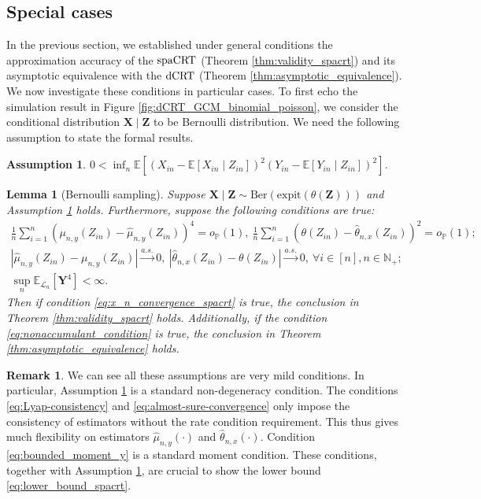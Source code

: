 \documentclass[12pt]{article}
\newtheorem{assumption}{Assumption}
\newtheorem{lemma}{Lemma}
\theoremstyle{definition}
\newtheorem{remark}{Remark}
\def\P{\mathbb{P}}
\def\P{\mathbb{P}}
\newcommand{\E}{\mathbb E}								%
\renewcommand{\P}{\mathbb{P}}							%
\newcommand{\expit}{\mathrm{expit}}                 	%
\newcommand{\prx}{\bm X}								%
\newcommand{\srx}{X}									%
\newcommand{\prz}{\bm Z}								%
\newcommand{\srz}{Z}									%
\newcommand{\pry}{{\bm Y}}								%
\newcommand{\sry}{Y}									%
\newcommand{\law}{\mathcal L}							%
\newcommand{\dCRT}{\textnormal{dCRT}} 					%
\newcommand{\spacrt}{\textnormal{spaCRT}}               %
\begin{document}
\subsection{Special cases}\label{sec:special_results}

In the previous section, we established under general conditions the approximation accuracy of the $\spacrt$ (Theorem \ref{thm:validity_spacrt}) and its asymptotic equivalence with the $\dCRT$ (Theorem \ref{thm:asymptotic_equivalence}). We now investigate these conditions in particular cases. To first echo the simulation result in Figure \ref{fig:dCRT_GCM_binomial_poisson}, we consider the conditional distribution $\prx\mid\prz$ to be Bernoulli distribution. We need the following assumption to state the formal results.

\begin{assumption}\label{assu:non_degeneracy_variance}
$0<\inf_n\E[(\srx_{in}-\E[\srx_{in}\mid \srz_{in}])^2(\sry_{in}-\E[\sry_{in}\mid \srz_{in}])^{2}]$.
\end{assumption}


\begin{lemma}[Bernoulli sampling]\label{lem:bernoulli_case}
	Suppose $\prx\mid\prz \sim \mathrm{Ber}(\expit(\theta(\prz)))$ and Assumption \ref{assu:non_degeneracy_variance} holds. Furthermore, suppose the following conditions are true:
	\begin{align}
		\frac{1}{n}\sum_{i=1}^n (\mu_{n,y}(\srz_{in})-\widehat{\mu}_{n,y}(\srz_{in}))^{4}=o_{\P}(1),\ \frac{1}{n}\sum_{i=1}^n (\theta(\srz_{in})-\widehat \theta_{n,x}(\srz_{in}))^{2}=o_{\P}(1)\label{eq:Lyap-consistency};\\
		|\widehat{\mu}_{n,y}(\srz_{in})-\mu_{n,y}(\srz_{in})|\overset{a.s.}{\rightarrow}0,\ |\widehat \theta_{n,x}(\srz_{in})-\theta(\srz_{in})|\overset{a.s.}{\rightarrow}0,\ \forall i\in [n],n\in\mathbb{N}_+\label{eq:almost-sure-convergence};\\
		\sup_n\E_{\law_n}[\pry^4]<\infty\label{eq:bounded_moment_y}.
	\end{align}
	Then if condition \eqref{eq:x_n_convergence_spacrt} is true, the conclusion in Theorem \ref{thm:validity_spacrt} holds. Additionally, if the condition \eqref{eq:nonaccumulant_condition} is true, the conclusion in Theorem \ref{thm:asymptotic_equivalence} holds.
\end{lemma}

\begin{remark}
  We can see all these assumptions are very mild conditions. In particular, Assumption \ref{assu:non_degeneracy_variance} is a standard non-degeneracy condition. The conditions \eqref{eq:Lyap-consistency} and \eqref{eq:almost-sure-convergence} only impose the consistency of estimators without the rate condition requirement. This thus gives much flexibility on estimators $\widehat{\mu}_{n,y}(\cdot)$ and $\widehat{\theta}_{n,x}(\cdot)$. Condition \eqref{eq:bounded_moment_y} is a standard moment condition. These conditions, together with Assumption \ref{assu:non_degeneracy_variance}, are crucial to show the lower bound \eqref{eq:lower_bound_spacrt}.
\end{remark}
\end{document}
